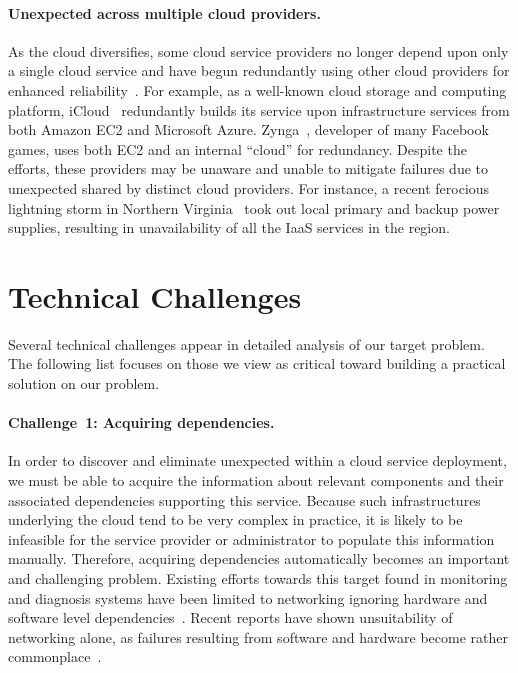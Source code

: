 \paragraph{Unexpected \rgs across multiple cloud providers.}
As the cloud diversifies, some cloud service providers 
no longer depend upon only a single cloud service and
have begun redundantly using other cloud providers
for enhanced reliability~\cite{bessani11depsky}. 
For example, as a well-known cloud storage and computing platform,
iCloud~\cite{iCloud} redundantly builds its service upon 
infrastructure services from both 
Amazon EC2 and Microsoft Azure. 
Zynga~\cite{Zynga}, developer of many Facebook games, 
uses both EC2 and an internal ``cloud'' for redundancy.
Despite the efforts, these providers may be 
unaware and unable to mitigate
failures due to unexpected \rgs shared by distinct cloud providers.
For instance, a recent ferocious lightning storm
in Northern Virginia~\cite{storm12, powerOut} 
took out local primary and backup power supplies,
resulting in unavailability of all the IaaS services in the region. 

\section{Technical Challenges}
\label{sec-chal}

Several technical challenges appear in detailed analysis of
our target problem.  The following list 
focuses on those we view as critical toward 
building a practical solution on our problem.

\paragraph{Challenge~1: Acquiring dependencies.}
In order to discover and eliminate 
unexpected \rgs within a cloud service deployment,
we must be able to acquire the information about relevant components 
and their associated dependencies
supporting this service.
Because such infrastructures underlying the
cloud tend to be very complex in practice,
it is likely to be infeasible for the 
service provider or administrator to populate this information manually.
Therefore, acquiring dependencies 
automatically becomes an important and challenging problem.
Existing efforts towards this target found in monitoring and
diagnosis systems have been limited to networking ignoring
hardware and software level dependencies~\cite{chen08automating}.
Recent reports have shown unsuitability of networking alone,
as failures resulting from software and hardware become
rather commonplace~\cite{Top10-2013}.

